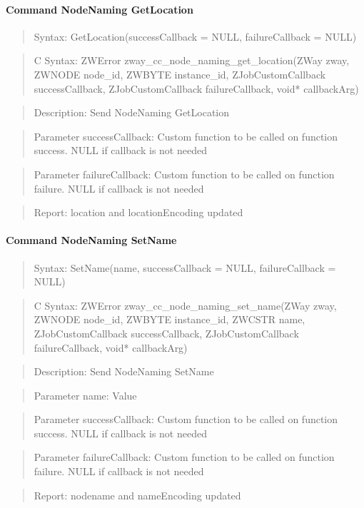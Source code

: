 \paragraph{Command NodeNaming GetLocation}
\begin{quote}Syntax: GetLocation(successCallback = NULL, failureCallback = NULL)\end{quote}
\begin{quote}C Syntax: ZWError zway\_cc\_node\_naming\_get\_location(ZWay zway, ZWNODE node\_id, ZWBYTE instance\_id, ZJobCustomCallback successCallback, ZJobCustomCallback failureCallback, void* callbackArg)\end{quote}
\begin{quote}Description: Send NodeNaming GetLocation\end{quote}
\begin{quote}Parameter successCallback: Custom function to be called on function success. NULL if callback is not needed\end{quote}
\begin{quote}Parameter failureCallback: Custom function to be called on function failure. NULL if callback is not needed\end{quote}
\begin{quote}Report: location and locationEncoding updated\end{quote}

\paragraph{Command NodeNaming SetName}
\begin{quote}Syntax: SetName(name, successCallback = NULL, failureCallback = NULL)\end{quote}
\begin{quote}C Syntax: ZWError zway\_cc\_node\_naming\_set\_name(ZWay zway, ZWNODE node\_id, ZWBYTE instance\_id, ZWCSTR name, ZJobCustomCallback successCallback, ZJobCustomCallback failureCallback, void* callbackArg)\end{quote}
\begin{quote}Description: Send NodeNaming SetName\end{quote}
\begin{quote}Parameter name: Value\end{quote}
\begin{quote}Parameter successCallback: Custom function to be called on function success. NULL if callback is not needed\end{quote}
\begin{quote}Parameter failureCallback: Custom function to be called on function failure. NULL if callback is not needed\end{quote}
\begin{quote}Report: nodename and nameEncoding updated\end{quote}

